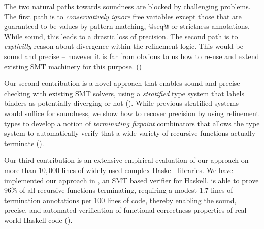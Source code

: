 The two natural paths towards soundness are blocked by challenging problems.
%
The first path is to \emph{conservatively ignore} free variables 
except those that are guaranteed to be values \eg by pattern 
matching, @seq@ or strictness annotations.  
While sound, this leads to a drastic loss of precision. 
%
The second path is to \emph{explicitly} reason about divergence 
within the refinement logic. This would be sound and 
precise -- however it is far from obvious to us how 
to re-use and extend existing SMT machinery for 
this purpose. ()


Our second contribution is a novel approach that
enables sound and precise checking with existing 
SMT solvers, using a \emph{stratified} type system that 
labels binders as potentially diverging or not 
().
%
While previous stratified systems~\cite{ConstableS87}
would suffice for soundness, we show how to recover 
precision by using refinement types to develop a 
notion of \emph{terminating fixpoint} combinators 
that allows the type system to automatically 
verify that a wide variety of recursive functions 
actually terminate ().

Our third contribution is an extensive empirical
evaluation of our approach on more than $10,000$ 
lines of widely used complex Haskell libraries.
We have implemented our approach in \toolname, 
an SMT based verifier for Haskell. 
%
\toolname is able to prove 96\% of 
all recursive functions terminating, requiring a modest 
1.7 lines of termination annotations per 100 lines 
of code, thereby enabling the sound, precise, 
and automated verification of functional 
correctness properties of real-world Haskell code 
().

